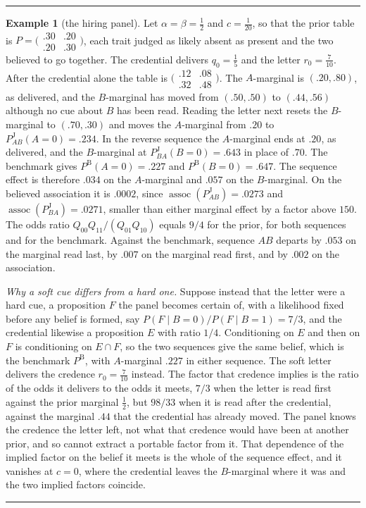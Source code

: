 \documentclass[a4paper,fleqn]{cas-sc}
\theoremstyle{remark}
\theoremstyle{definition}
\newtheorem{example}{Example}
\newcommand{\PB}{P^{\mathrm{B}}}
\newcommand{\PJ}{P^{\mathrm{J}}}
\newcommand{\assoc}{\operatorname{assoc}}
\begin{document}
\par\noindent\rule{\linewidth}{0.4pt}
\begin{example}[the hiring panel]\label{ex:panel}
Let $\alpha=\beta=\tfrac12$ and $c=\tfrac1{20}$,
so that the prior table is
$P=\bigl(\begin{smallmatrix}.30&.20\\.20&.30\end{smallmatrix}\bigr)$, each trait
judged as likely absent as present and the two believed to go together. The
credential delivers $q_0=\tfrac15$ and the letter $r_0=\tfrac7{10}$. After the
credential alone the table is
$\bigl(\begin{smallmatrix}.12&.08\\.32&.48\end{smallmatrix}\bigr)$. The
$A$-marginal is $(.20,.80)$, as delivered, and the $B$-marginal has moved from
$(.50,.50)$ to $(.44,.56)$ although no cue about $B$ has been read. Reading the
letter next resets the $B$-marginal to $(.70,.30)$ and moves the $A$-marginal
from $.20$ to $\PJ_{AB}(A{=}0)=.234$. In the reverse sequence the $A$-marginal
ends at $.20$, as delivered, and the $B$-marginal at $\PJ_{BA}(B{=}0)=.643$ in
place of $.70$. The benchmark gives $\PB(A{=}0)=.227$ and $\PB(B{=}0)=.647$. The
sequence effect is therefore $.034$ on the $A$-marginal and $.057$ on the
$B$-marginal. On the believed association it is $.0002$, since
$\assoc(\PJ_{AB})=.0273$ and $\assoc(\PJ_{BA})=.0271$, smaller than either
marginal effect by a factor above $150$. The odds ratio $Q_{00}Q_{11}/(Q_{01}Q_{10})$ equals $9/4$ for the
prior, for both sequences and for the benchmark. Against the benchmark, sequence
$AB$ departs by $.053$ on the marginal read last, by $.007$ on the marginal read
first, and by $.002$ on the association.
\par
\emph{Why a soft cue differs from a hard one.} Suppose instead that the letter
were a hard cue, a proposition $F$ the panel becomes certain of, with a likelihood
fixed before any belief is formed, say $P(F\mid B{=}0)/P(F\mid B{=}1)=7/3$, and the
credential likewise a proposition $E$ with ratio $1/4$. Conditioning on $E$ and then
on $F$ is conditioning on $E\cap F$, so the two sequences give the same belief, which
is the benchmark $\PB$, with $A$-marginal $.227$ in either sequence. The soft letter
delivers the credence $r_0=\tfrac7{10}$ instead. The factor that credence implies is
the ratio of the odds it delivers to the odds it meets, $7/3$ when the letter is
read first against the prior marginal $\tfrac12$, but $98/33$ when it is read after
the credential, against the marginal $.44$ that the credential has already moved.
The panel knows the credence the letter left, not what that credence would have
been at another prior, and so cannot extract a portable factor from it. That
dependence of the implied factor on the belief it meets is the whole of the
sequence effect, and it vanishes at $c=0$, where the credential leaves the
$B$-marginal where it was and the two implied factors coincide.
\end{example}
\noindent\rule{\linewidth}{0.4pt}
\end{document}

